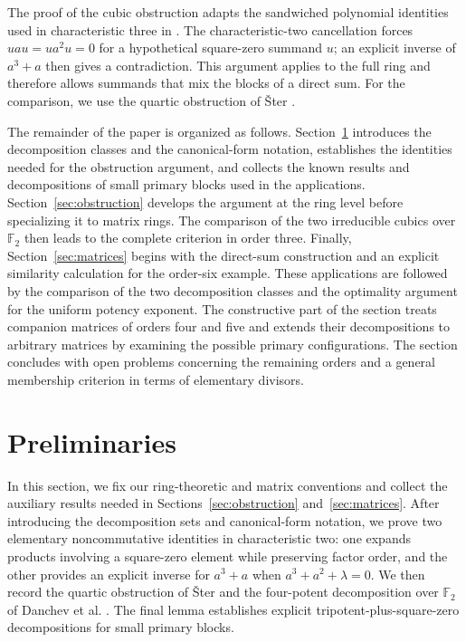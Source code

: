 \documentclass[12pt]{amsart}
\theoremstyle{remark}
\numberwithin{equation}{section}
\theoremstyle{definition}
\newcommand{\F}{\mathbb F}
\begin{document}
The proof of the cubic obstruction adapts the sandwiched polynomial identities used in characteristic three in \cite[Lemma~3.5 and Proposition~3.6]{DGLOdd}. The characteristic-two cancellation forces $uau=ua^2u=0$ for a hypothetical square-zero summand $u$; an explicit inverse of $a^3+a$ then gives a contradiction. This argument applies to the full ring and therefore allows summands that mix the blocks of a direct sum. For the comparison, we use the quartic obstruction of \v{S}ter \cite[Theorem~3]{Ster2022}. 

The remainder of the paper is organized as follows. Section~\ref{sec:prelim} introduces the decomposition classes and the canonical-form notation, establishes the identities needed for the obstruction argument, and collects the known results and decompositions of small primary blocks used in the applications. Section~\ref{sec:obstruction} develops the argument at the ring level before specializing it to matrix rings. The comparison of the two irreducible cubics over $\F_2$ then leads to the complete criterion in order three. Finally, Section~\ref{sec:matrices} begins with the direct-sum construction and an explicit similarity calculation for the order-six example. These applications are followed by the comparison of the two decomposition classes and the optimality argument for the uniform potency exponent. The constructive part of the section treats companion matrices of orders four and five and extends their decompositions to arbitrary matrices by examining the possible primary configurations. The section concludes with open problems concerning the remaining orders and a general membership criterion in terms of elementary divisors.

\section{Preliminaries}\label{sec:prelim}

In this section, we fix our ring-theoretic and matrix conventions and collect the auxiliary results needed in Sections~\ref{sec:obstruction} and~\ref{sec:matrices}. After introducing the decomposition sets and canonical-form notation, we prove two elementary noncommutative identities in characteristic two: one expands products involving a square-zero element while preserving factor order, and the other provides an explicit inverse for $a^3+a$ when $a^3+a^2+\lambda=0$. We then record the quartic obstruction of \v{S}ter \cite{Ster2022} and the four-potent decomposition over $\F_2$ of Danchev et al. \cite{DGLEven}. The final lemma establishes explicit tripotent-plus-square-zero decompositions for small primary blocks.
\end{document}
